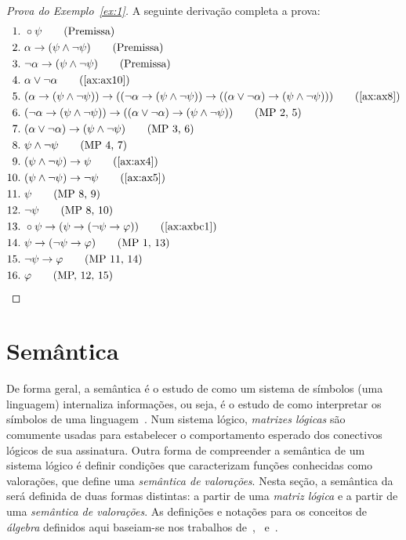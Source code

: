     \begin{proof}[Prova do Exemplo~\ref{ex:1}]
        A seguinte derivação completa a prova:
        \begin{align*}
            1.~& \circ \psi \tag{Premissa} \\
            2.~& \alpha \to (\psi \land \neg \psi) \tag{Premissa} \\
            3.~& \neg \alpha \to (\psi \land \neg \psi) \tag{Premissa} \\
            4.~& \alpha \lor \neg \alpha \tag{\ref{ax:ax10}} \\
            5.~& (\alpha \to (\psi \land \neg \psi)) \to ((\neg \alpha \to (\psi \land \neg \psi)) \to ((\alpha \lor \neg \alpha) \to (\psi \land \neg \psi))) \tag{\ref{ax:ax8}} \\
            6.~& (\neg \alpha \to (\psi \land \neg \psi)) \to ((\alpha \lor \neg \alpha) \to (\psi \land \neg \psi)) \tag{MP 2, 5}\\
            7.~& (\alpha \lor \neg \alpha) \to (\psi \land \neg \psi) \tag{MP 3, 6}\\
            8.~& \psi \land \neg \psi \tag{MP 4, 7} \\
            9.~& (\psi \land \neg \psi) \to \psi \tag{\ref{ax:ax4}} \\
            10.~& (\psi \land \neg \psi) \to \neg \psi \tag{\ref{ax:ax5}} \\
            11.~& \psi \tag{MP 8, 9}\\
            12.~& \neg \psi \tag{MP 8, 10}\\
            13.~& \circ \psi \to (\psi \to (\neg \psi \to \phi)) \tag{\ref{ax:axbc1}}\\
            14.~& \psi \to (\neg \psi \to \phi) \tag{MP 1, 13}\\
            15.~& \neg \psi \to \phi \tag{MP 11, 14} \\
            16.~& \phi \tag{MP, 12, 15}
        \end{align*}
    \end{proof}


\section{Semântica}\label{sec:semantica}
    De forma geral, a semântica é o estudo de como um sistema de símbolos (uma linguagem) internaliza informações, ou seja, é o estudo de como interpretar os símbolos de uma linguagem~\cite{brown2005encyclopedia}. Num sistema lógico, \textit{matrizes lógicas} são comumente usadas para estabelecer o comportamento esperado dos conectivos lógicos de sua assinatura. Outra forma de compreender a semântica de um sistema lógico é definir condições que caracterizam funções conhecidas como valorações, que define uma \textit{semântica de valorações}. Nesta seção, a semântica da \lfium{} será definida de duas formas distintas: a partir de uma \textit{matriz lógica} e a partir de uma \textit{semântica de valorações}. As definições e notações para os conceitos de \textit{álgebra} definidos aqui baseiam-se nos trabalhos de~,~ e~.
    
